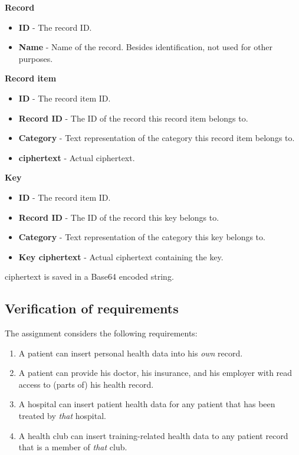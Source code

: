 \documentclass[a4paper]{article}
\begin{document}
		\textbf{Record}
		\begin{itemize}
			\item \textbf{ID} - The record ID.
			\item \textbf{Name} - Name of the record. Besides identification, not used for other purposes.
		\end{itemize}
		
		\textbf{Record item}
		\begin{itemize}
			\item \textbf{ID} - The record item ID.
			\item \textbf{Record ID} - The ID of the record this record item belongs to.
			\item \textbf{Category} - Text representation of the category this record item belongs to.
			\item \textbf{ciphertext} - Actual ciphertext.
		\end{itemize}
		
		\textbf{Key}
		\begin{itemize}
			\item \textbf{ID} - The record item ID.
			\item \textbf{Record ID} - The ID of the record this key belongs to.
			\item \textbf{Category} - Text representation of the category this key belongs to.
			\item \textbf{Key ciphertext} - Actual ciphertext containing the key.
		\end{itemize}
	
		ciphertext is saved in a Base64 encoded string.
	
	\subsection{Verification of requirements}
		The assignment considers the following requirements:
		
		\begin{enumerate}
			\item{A patient can insert personal health data into his \textit{own} record.}
			\item{A patient can provide his doctor, his insurance, and his employer with read access to (parts of) his health record.}
			\item{A hospital can insert patient health data for any patient that has been treated by \textit{that} hospital.}
			\item{A health club can insert training-related health data to any patient record that is a member of \textit{that} club.}
		\end{enumerate}
		
\end{document}
